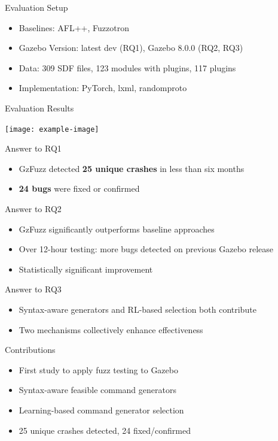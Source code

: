 \documentclass{beamer}
\begin{document}
\begin{frame}{Evaluation Setup}
\begin{itemize}
\item Baselines: AFL++, Fuzzotron
\item Gazebo Version: latest dev (RQ1), Gazebo 8.0.0 (RQ2, RQ3)
\item Data: 309 SDF files, 123 modules with plugins, 117 plugins
\item Implementation: PyTorch, lxml, randomproto
\end{itemize}
\end{frame}

\begin{frame}{Evaluation Results}
\begin{center}
\texttt{[image: example-image]}
\end{center}
\end{frame}

\begin{frame}{Answer to RQ1}
\begin{itemize}
\item GzFuzz detected \textbf{25 unique crashes} in less than six months
\item \textbf{24 bugs} were fixed or confirmed
\end{itemize}
\end{frame}

\begin{frame}{Answer to RQ2}
\begin{itemize}
\item GzFuzz significantly outperforms baseline approaches
\item Over 12-hour testing: more bugs detected on previous Gazebo release
\item Statistically significant improvement
\end{itemize}
\end{frame}

\begin{frame}{Answer to RQ3}
\begin{itemize}
\item Syntax-aware generators and RL-based selection both contribute
\item Two mechanisms collectively enhance effectiveness
\end{itemize}
\end{frame}

\begin{frame}{Contributions}
\begin{itemize}
\item First study to apply fuzz testing to Gazebo
\item Syntax-aware feasible command generators
\item Learning-based command generator selection
\item 25 unique crashes detected, 24 fixed/confirmed
\end{itemize}
\end{frame}
\end{document}

